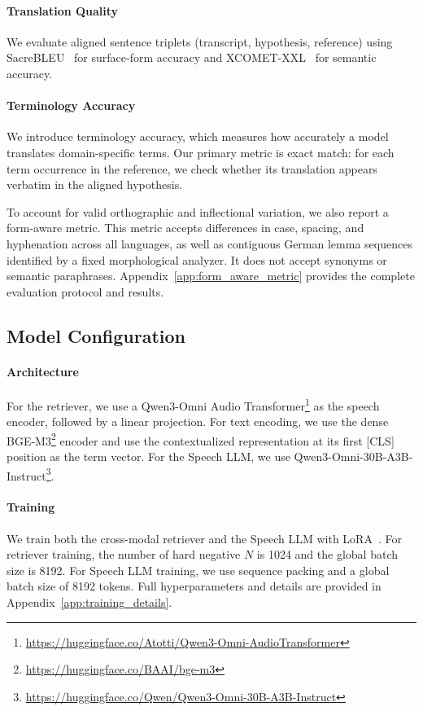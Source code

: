 \paragraph{Translation Quality}
We evaluate aligned sentence triplets (transcript, hypothesis, reference) using SacreBLEU~\citep{papineni-etal-2002-bleu,post-2018-call} for surface-form accuracy and XCOMET-XXL~\citep{guerreiro-etal-2024-xcomet} for semantic accuracy.


\paragraph{Terminology Accuracy}
We introduce terminology accuracy, which measures how accurately a model translates domain-specific terms. Our primary metric is exact match: for each term occurrence in the reference, we check whether its translation appears verbatim in the aligned hypothesis.

To account for valid orthographic and inflectional variation, we also report a form-aware metric. This metric accepts differences in case, spacing, and hyphenation across all languages, as well as contiguous German lemma sequences identified by a fixed morphological analyzer. It does not accept synonyms or semantic paraphrases. Appendix~\ref{app:form_aware_metric} provides the complete evaluation protocol and results.


\subsection{Model Configuration}
\label{sec:retriever_training}

\paragraph{Architecture}
For the retriever, we use a Qwen3-Omni Audio Transformer\footnote{\url{https://huggingface.co/Atotti/Qwen3-Omni-AudioTransformer}} as the speech encoder, followed by a linear projection. For text encoding, we use the dense BGE-M3\footnote{\url{https://huggingface.co/BAAI/bge-m3}} encoder and use the contextualized representation at its first \textsc{[CLS]} position as the term vector. For the Speech LLM, we use Qwen3-Omni-30B-A3B-Instruct\footnote{\url{https://huggingface.co/Qwen/Qwen3-Omni-30B-A3B-Instruct}}.

\paragraph{Training}
We train both the cross-modal retriever and the Speech LLM with LoRA~\citep{hu2022lora}. For retriever training, the number of hard negative $N$ is 1024 and the global batch size is 8192. For Speech LLM training, we use sequence packing and a global batch size of 8192 tokens. Full hyperparameters and details are provided in Appendix~\ref{app:training_details}.

